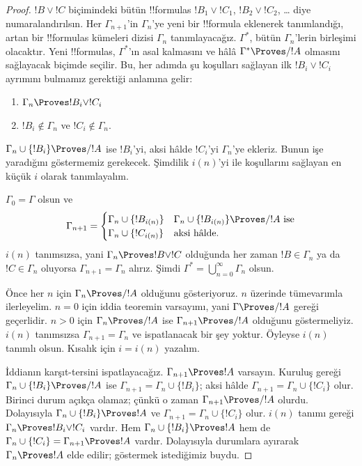 \begin{proof}
  $!B\lor !C$ biçimindeki bütün !!{formula}s
  $!B_1\lor !C_1$, $!B_2\lor !C_2$, \dots{} diye numaralandırılsın. Her
  $\Gamma_{n+1}$'in $\Gamma_n$'ye yeni bir !!{formula} eklenerek
  tanımlandığı, artan bir !!{formula}s kümeleri dizisi $\Gamma_n$
  tanımlayacağız. $\Gamma^*$, bütün $\Gamma_n$'lerin birleşimi olacaktır.
  Yeni !!{formula}s, $\Gamma^*$'ın asal kalmasını ve hâlâ
  $\Gamma^*\Proves/ !A$ olmasını sağlayacak biçimde seçilir. Bu, her adımda
  şu koşulları sağlayan ilk $!B_i\lor !C_i$ ayrımını bulmamız gerektiği
  anlamına gelir:
  \begin{enumerate}
  \item{} $\Gamma_n \Proves !B_i \lor !C_i$
  \item{} $!B_i \notin \Gamma_n$ ve
    $!C_i \notin \Gamma_n$.
  \end{enumerate}
  $\Gamma_n\cup\{!B_i\}\Proves/ !A$ ise $!B_i$'yi, aksi hâlde $!C_i$'yi
  $\Gamma_n$'ye ekleriz. Bunun işe yaradığını göstermemiz gerekecek.
  Şimdilik $i(n)$'yi  ile  koşullarını
  sağlayan en küçük $i$ olarak tanımlayalım.

  $\Gamma_0=\Gamma$ olsun ve
  \[
  \Gamma_{n+1} = \begin{cases}
    \Gamma_n \cup \{!B_{i(n)}\} &
    \text{$\Gamma_n \cup \{!B_{i(n)}\} \Proves/ !A$ ise} \\
    \Gamma_n \cup \{!C_{i(n)}\} & \text{aksi hâlde.}
    \end{cases}
  \]
  $i(n)$ tanımsızsa, yani $\Gamma_n\Proves !B\lor !C$ olduğunda her zaman
  $!B\in\Gamma_n$ ya da $!C\in\Gamma_n$ oluyorsa
  $\Gamma_{n+1}=\Gamma_n$ alırız. Şimdi
  $\Gamma^*=\bigcup_{n=0}^{\infty}\Gamma_n$ olsun.

  Önce her $n$ için $\Gamma_n\Proves/ !A$ olduğunu gösteriyoruz. $n$
  üzerinde tümevarımla ilerleyelim. $n=0$ için iddia teoremin varsayımı,
  yani $\Gamma\Proves/ !A$ gereği geçerlidir. $n>0$ için
  $\Gamma_n\Proves/ !A$ ise $\Gamma_{n+1}\Proves/ !A$ olduğunu
  göstermeliyiz. $i(n)$ tanımsızsa $\Gamma_{n+1}=\Gamma_n$ ve
  ispatlanacak bir şey yoktur. Öyleyse $i(n)$ tanımlı olsun. Kısalık için
  $i=i(n)$ yazalım.

  İddianın karşıt-tersini ispatlayacağız. $\Gamma_{n+1}\Proves !A$
  varsayın. Kuruluş gereği $\Gamma_n\cup\{!B_i\}\Proves/ !A$ ise
  $\Gamma_{n+1}=\Gamma_n\cup\{!B_i\}$; aksi hâlde
  $\Gamma_{n+1}=\Gamma_n\cup\{!C_i\}$ olur. Birinci durum açıkça olamaz;
  çünkü o zaman $\Gamma_{n+1}\Proves/ !A$ olurdu. Dolayısıyla
  $\Gamma_n\cup\{!B_i\}\Proves !A$ ve
  $\Gamma_{n+1}=\Gamma_n\cup\{!C_i\}$ olur. $i(n)$ tanımı gereği
  $\Gamma_n\Proves !B_i\lor !C_i$ vardır. Hem
  $\Gamma_n\cup\{!B_i\}\Proves !A$ hem de
  $\Gamma_n\cup\{!C_i\}=\Gamma_{n+1}\Proves !A$ vardır. Dolayısıyla
  durumlara ayırarak $\Gamma_n\Proves !A$ elde edilir; göstermek
  istediğimiz buydu.


\end{proof}
